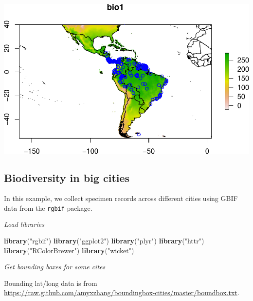 \documentclass[3p]{elsarticle} %
\makeatletter
\newenvironment{Shaded}{\begin{snugshade}}{\end{snugshade}}
\newcommand{\KeywordTok}[1]{\textcolor[rgb]{0.13,0.29,0.53}{\textbf{#1}}}
\newcommand{\NormalTok}[1]{#1}
\newcommand{\StringTok}[1]{\textcolor[rgb]{0.31,0.60,0.02}{#1}}
\def\maxwidth{\ifdim\Gin@nat@width>\linewidth\linewidth
\else\Gin@nat@width\fi}
\let\Oldincludegraphics\includegraphics
\renewcommand{\includegraphics}[1]{\Oldincludegraphics[width=\maxwidth]{#1}}
\makeatother
\begin{document}
\includegraphics{components/figure/manuscript_mee-unnamed-chunk-57-1.pdf}

\hypertarget{biodiversity-in-big-cities}{%
\subsection{Biodiversity in big
cities}\label{biodiversity-in-big-cities}}

In this example, we collect specimen records across different cities
using GBIF data from the \texttt{rgbif} package.

\emph{Load libraries}

\begin{Shaded}
\begin{Highlighting}[]
\KeywordTok{library}\NormalTok{(}\StringTok{"rgbif"}\NormalTok{)}
\KeywordTok{library}\NormalTok{(}\StringTok{"ggplot2"}\NormalTok{)}
\KeywordTok{library}\NormalTok{(}\StringTok{"plyr"}\NormalTok{)}
\KeywordTok{library}\NormalTok{(}\StringTok{"httr"}\NormalTok{)}
\KeywordTok{library}\NormalTok{(}\StringTok{"RColorBrewer"}\NormalTok{)}
\KeywordTok{library}\NormalTok{(}\StringTok{"wicket"}\NormalTok{)}
\end{Highlighting}
\end{Shaded}

\emph{Get bounding boxes for some cites}

Bounding lat/long data is from
\url{https://raw.github.com/amyxzhang/boundingbox-cities/master/boundbox.txt}.
\end{document}
